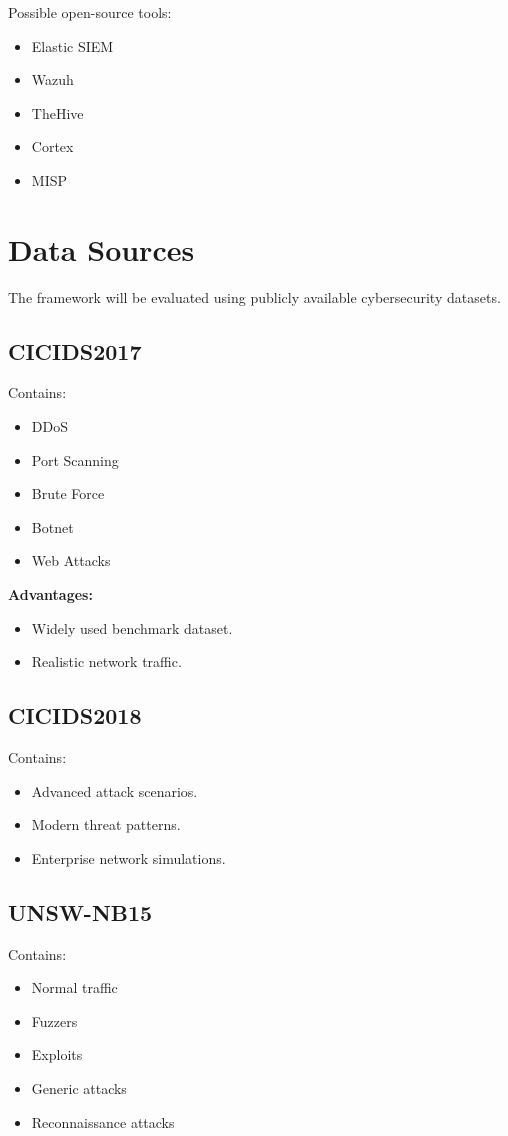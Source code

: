 \documentclass[12pt,a4paper]{report}
\begin{document}
Possible open-source tools:
\begin{itemize}
    \item Elastic SIEM
    \item Wazuh
    \item TheHive
    \item Cortex
    \item MISP
\end{itemize}

\section{Data Sources}
\label{sec:data_sources}

The framework will be evaluated using publicly available cybersecurity datasets.

\subsection{CICIDS2017}
Contains:
\begin{itemize}
    \item DDoS
    \item Port Scanning
    \item Brute Force
    \item Botnet
    \item Web Attacks
\end{itemize}

\textbf{Advantages:}
\begin{itemize}
    \item Widely used benchmark dataset.
    \item Realistic network traffic.
\end{itemize}

\subsection{CICIDS2018}
Contains:
\begin{itemize}
    \item Advanced attack scenarios.
    \item Modern threat patterns.
    \item Enterprise network simulations.
\end{itemize}

\subsection{UNSW-NB15}
Contains:
\begin{itemize}
    \item Normal traffic
    \item Fuzzers
    \item Exploits
    \item Generic attacks
    \item Reconnaissance attacks
\end{itemize}
\end{document}
